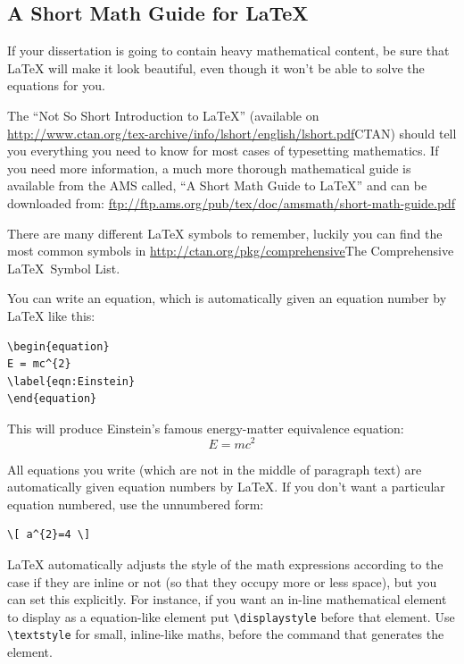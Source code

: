 \subsection{A Short Math Guide for \LaTeX{}}

If your dissertation is going to contain heavy mathematical content, be sure that \LaTeX{} will make it look beautiful, even though it won't be able to solve the equations for you.

The \enquote{Not So Short Introduction to \LaTeX} (available on \url{http://www.ctan.org/tex-archive/info/lshort/english/lshort.pdf}{CTAN}) should tell you everything you need to know for most cases of typesetting mathematics. If you need more information, a much more thorough mathematical guide is available from the AMS called, \enquote{A Short Math Guide to \LaTeX} and can be downloaded from:
\url{ftp://ftp.ams.org/pub/tex/doc/amsmath/short-math-guide.pdf}

There are many different \LaTeX{} symbols to remember, luckily you can find the most common symbols in \url{http://ctan.org/pkg/comprehensive}{The Comprehensive \LaTeX~Symbol List}.

You can write an equation, which is automatically given an equation number by \LaTeX{} like this:
\begin{verbatim}
\begin{equation}
E = mc^{2}
\label{eqn:Einstein}
\end{equation}
\end{verbatim}

This will produce Einstein's famous energy-matter equivalence equation:
\begin{equation}
E = mc^{2}
\label{eqn:Einstein}
\end{equation}

All equations you write (which are not in the middle of paragraph text) are automatically given equation numbers by \LaTeX{}. If you don't want a particular equation numbered, use the unnumbered form:
\begin{verbatim}
\[ a^{2}=4 \]
\end{verbatim}

\LaTeX{} automatically adjusts the style of the math expressions according to the case if they are inline or not (so that they occupy more or less space), but you can set this explicitly. For instance, if you want an in-line mathematical element to display as a equation-like element put \verb|\displaystyle| before that element. Use \verb|\textstyle| for small, inline-like maths, before the command that generates the element.

